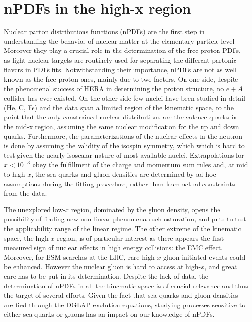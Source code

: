


%
\section{nPDFs in the high-x region}

Nuclear parton distributions functions (nPDFs) are the first step in understanding the behavior of nuclear matter at the elementary particle level. Moreover they play a crucial role in the determination of the free proton PDFs, as light nuclear targets are routinely used for separating the different partonic flavors in PDFs fits. Notwithstanding their importance, nPDFs are not as well known as the free proton ones, mainly due to two factors. On one side, despite the phenomenal success of HERA in determining the proton structure, no $e+A$ collider has ever existed. On the other side few nuclei have been studied in detail (He, C, Fe) and the data span a limited region of the kinematic space, to the point that the only constrained nuclear distributions are the valence quarks in the mid-x region, assuming the same nuclear modification for the up and down quarks. Furthermore, the parameterizations of the nuclear effects in the neutron is done by assuming the validity of the isospin symmetry, which which is hard to test given the nearly isoscalar nature of most available nuclei. Extrapolations for $x < 10^{-3}$ obey the fulfillment of the charge and momentum sum rules and, at mid to high-$x$, the sea quarks and gluon densities are determined by ad-hoc assumptions during the fitting procedure, rather than from actual constraints from the data. 

The unexplored low-$x$ region, dominated by the gluon density, opens the possibility of finding new non-linear phenomena such saturation, and puts to test the applicability range of the linear regime. The other extreme of the kinematic space, the high-$x$ region, is of particular interest as there appears the first measured sign of nuclear effects in high energy collisions: the EMC effect. Moreover, for BSM searches at the LHC, rare high-$x$ gluon initiated events could be enhanced. However the nuclear gluon is hard to access at high-$x$, and great care has to be put in its determination. Despite the lack of data, the determination of nPDFs in all the kinematic space is of crucial relevance and thus the target of several efforts. Given the fact that sea quarks and gluon densities are tied through the DGLAP evolution equations, studying processes sensitive to either sea quarks or gluons has an impact on our knowledge of nPDFs.    

